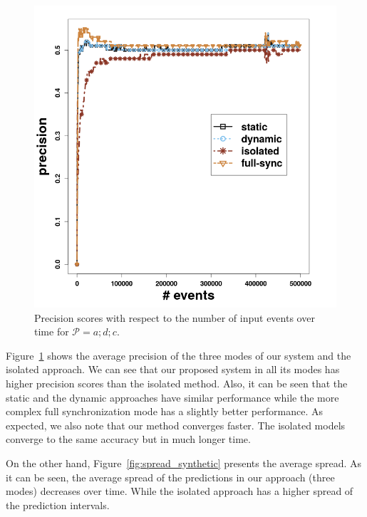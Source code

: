 \begin{figure}[H]
	\centering
	\includegraphics[width=\textwidth]{chapters/figures/synthetic/precision_synthetic_15_0001.png}
	
	\caption{Precision scores with respect to the number of input events over time for $\mathcal{P}=a;d;c$.}
	\label{fig:precsion_synthetic}
\end{figure}

\par Figure~\ref{fig:precsion_synthetic} shows the average precision of the three modes of our system and the isolated approach. We can see that our proposed system in all its modes has higher precision scores than the isolated method. Also, it can be seen that the static and the dynamic approaches have similar performance while the more complex full synchronization mode has a slightly better performance. As expected, we also note that our method converges faster. The isolated models converge to the same accuracy but in much longer time.

\par On the other hand, Figure~\ref{fig:spread_synthetic} presents the average spread. As it can be seen, the average spread of the predictions in our approach (three modes) decreases over time. While the isolated approach has a higher spread of the prediction intervals. 

